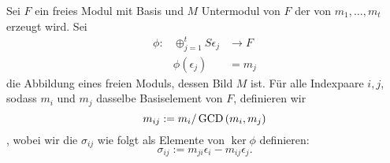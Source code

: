\documentclass{article}
\begin{document}
\begin{nota}
	Sei 
	\( F \) 
	ein freies Modul mit Basis 
	und
	\( M \)
	Untermodul von 
	\( F \)
	der von 
	\( m_{1} , \dots , m_{t} \)
	erzeugt wird.
	Sei
	\begin{align*}
		\phi:	& \oplus_{j=1}^{t} S\epsilon_{j} &\to   F \\
			& \phi\left( \epsilon_{j} \right) &=  m_{j}
	\end{align*}
	die Abbildung eines freien Moduls, dessen Bild
	\( M \)
	ist.
	F\"ur alle Indexpaare 	
	\( i,j \),
	sodass 
	\( m_{i}\)
	und 
	\( m_{j}\)
	dasselbe Basiselement von 
	\( F \),
	definieren wir 
	\[
		m_{ij} := m_{i}/\operatorname{GCD}\left( m_{i},m_{j} \right) 
	\],
	wobei wir die 
	\( \sigma_{ij}\)
	wie folgt als Elemente von 
	\( \ker \phi \)
	definieren:
	\[
		\sigma_{ij} := m_{ji}\epsilon_{i}-m_{ij}\epsilon_{j} .
	\]

\end{nota}
\end{document}
